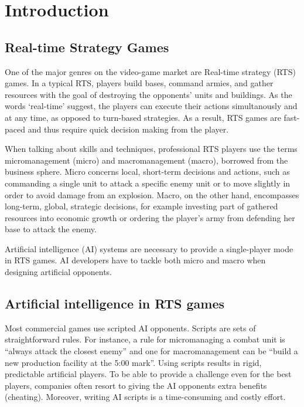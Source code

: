 \chapter{Introduction}

\section{Real-time Strategy Games}

One of the major genres on the video-game market are Real-time strategy (RTS) games. In a typical RTS, players build bases, command armies, and gather resources with the goal of destroying the opponents' units and buildings. As the words `real-time' suggest, the players can execute their actions simultanously and at any time, as opposed to turn-based strategies. As a result, RTS games are fast-paced and thus require quick decision making from the player. 

When talking about skills and techniques, professional RTS players use the terms micromanagement (micro) and macromanagement (macro), borrowed from the business sphere. Micro concerns local, short-term decisions and actions, such as commanding a single unit to attack a specific enemy unit or to move slightly in order to avoid damage from an explosion. Macro, on the other hand, encompasses long-term, global, strategic decisions, for example investing part of gathered resources into economic growth or ordering the player's army from defending her base to attack the enemy.

Artificial intelligence (AI) systems are necessary to provide a single-player mode in RTS games. AI developers have to tackle both micro and macro when designing artificial opponents.

\section{Artificial intelligence in RTS games}

Most commercial games use scripted AI opponents. Scripts are sets of straightforward rules. For instance, a rule for micromanaging a combat unit is ``always attack the closest enemy'' and one for macromanagement can be ``build a new production facility at the 5:00 mark''. Using scripts results in rigid, predictable artificial players. To be able to provide a challenge even for the best players, companies often resort to giving the AI opponents extra benefits (cheating). Moreover, writing AI scripts is a time-consuming and costly effort.


